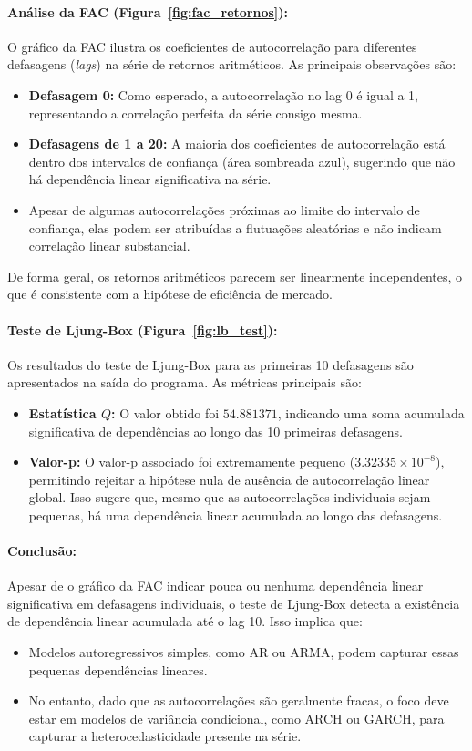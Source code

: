 \documentclass[a4paper, 12pt]{article}
\begin{document}
\paragraph{Análise da FAC (Figura~\ref{fig:fac_retornos}):}
O gráfico da FAC ilustra os coeficientes de autocorrelação para diferentes defasagens (\textit{lags}) na série de retornos aritméticos. As principais observações são:
\begin{itemize}
    \item \textbf{Defasagem 0:} Como esperado, a autocorrelação no lag 0 é igual a 1, representando a correlação perfeita da série consigo mesma.
    \item \textbf{Defasagens de 1 a 20:} A maioria dos coeficientes de autocorrelação está dentro dos intervalos de confiança (área sombreada azul), sugerindo que não há dependência linear significativa na série. 
    \item Apesar de algumas autocorrelações próximas ao limite do intervalo de confiança, elas podem ser atribuídas a flutuações aleatórias e não indicam correlação linear substancial.
\end{itemize}
De forma geral, os retornos aritméticos parecem ser linearmente independentes, o que é consistente com a hipótese de eficiência de mercado.

\paragraph{Teste de Ljung-Box (Figura~\ref{fig:lb_test}):}
Os resultados do teste de Ljung-Box para as primeiras 10 defasagens são apresentados na saída do programa. As métricas principais são:
\begin{itemize}
    \item \textbf{Estatística \(Q\):} O valor obtido foi \(54.881371\), indicando uma soma acumulada significativa de dependências ao longo das 10 primeiras defasagens.
    \item \textbf{Valor-p:} O valor-p associado foi extremamente pequeno (\(3.32335 \times 10^{-8}\)), permitindo rejeitar a hipótese nula de ausência de autocorrelação linear global. Isso sugere que, mesmo que as autocorrelações individuais sejam pequenas, há uma dependência linear acumulada ao longo das defasagens.
\end{itemize}

\paragraph{Conclusão:}
Apesar de o gráfico da FAC indicar pouca ou nenhuma dependência linear significativa em defasagens individuais, o teste de Ljung-Box detecta a existência de dependência linear acumulada até o lag 10. Isso implica que:
\begin{itemize}
    \item Modelos autoregressivos simples, como AR ou ARMA, podem capturar essas pequenas dependências lineares.
    \item No entanto, dado que as autocorrelações são geralmente fracas, o foco deve estar em modelos de variância condicional, como ARCH ou GARCH, para capturar a heterocedasticidade presente na série.
\end{itemize}
\end{document}
